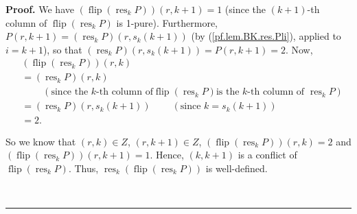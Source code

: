 \documentclass[numbers=enddot,12pt,final,onecolumn,notitlepage]{scrartcl}%
\theoremstyle{definition}
\newenvironment{proof}[1][Proof]{\noindent\textbf{#1.} }{\ \rule{0.5em}{0.5em}}
\begin{document}
\begin{proof}
We have $\left(  \operatorname*{flip}\left(  \operatorname*{res}%
\nolimits_{k}P\right)  \right)  \left(  r,k+1\right)  =1$ (since the $\left(
k+1\right)  $-th column of $\operatorname*{flip}\left(  \operatorname*{res}%
\nolimits_{k}P\right)  $ is 1-pure). Furthermore, $P\left(  r,k+1\right)
=\left(  \operatorname*{res}\nolimits_{k}P\right)  \left(  r,s_{k}\left(
k+1\right)  \right)  $ (by (\ref{pf.lem.BK.res.Pli}), applied to $i=k+1$), so
that $\left(  \operatorname*{res}\nolimits_{k}P\right)  \left(  r,s_{k}\left(
k+1\right)  \right)  =P\left(  r,k+1\right)  =2$. Now,
\begin{align*}
&  \left(  \operatorname*{flip}\left(  \operatorname*{res}\nolimits_{k}%
P\right)  \right)  \left(  r,k\right) \\
&  =\left(  \operatorname*{res}\nolimits_{k}P\right)  \left(  r,k\right) \\
&  \ \ \ \ \ \ \ \ \ \ \left(  \text{since the }k\text{-th column of
}\operatorname*{flip}\left(  \operatorname*{res}\nolimits_{k}P\right)  \text{
is the }k\text{-th column of }\operatorname*{res}\nolimits_{k}P\right) \\
&  =\left(  \operatorname*{res}\nolimits_{k}P\right)  \left(  r,s_{k}\left(
k+1\right)  \right)  \ \ \ \ \ \ \ \ \ \ \left(  \text{since }k=s_{k}\left(
k+1\right)  \right) \\
&  =2.
\end{align*}


So we know that $\left(  r,k\right)  \in Z$, $\left(  r,k+1\right)  \in Z$,
$\left(  \operatorname*{flip}\left(  \operatorname*{res}\nolimits_{k}P\right)
\right)  \left(  r,k\right)  =2$ and $\left(  \operatorname*{flip}\left(
\operatorname*{res}\nolimits_{k}P\right)  \right)  \left(  r,k+1\right)  =1$.
Hence, $\left(  k,k+1\right)  $ is a conflict of $\operatorname*{flip}\left(
\operatorname*{res}\nolimits_{k}P\right)  $. Thus, $\operatorname*{res}%
\nolimits_{k}\left(  \operatorname*{flip}\left(  \operatorname*{res}%
\nolimits_{k}P\right)  \right)  $ is well-defined.


\end{proof}
\end{document}
